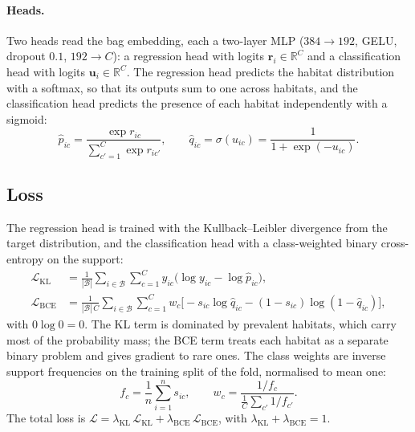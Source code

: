 \paragraph{Heads.}
Two heads read the bag embedding, each a two-layer MLP
($384 \to 192$, GELU, dropout $0.1$, $192 \to C$):
a regression head with logits $\mathbf{r}_i \in \mathbb{R}^{C}$ and a
classification head with logits $\mathbf{u}_i \in \mathbb{R}^{C}$. The regression
head predicts the habitat distribution with a softmax, so that its outputs sum
to one across habitats, and the classification head predicts the presence of
each habitat independently with a sigmoid:
\begin{equation}
  \hat p_{ic} = \frac{\exp r_{ic}}{\sum_{c'=1}^{C} \exp r_{ic'}}, \qquad
  \hat q_{ic} = \sigma(u_{ic}) = \frac{1}{1 + \exp(-u_{ic})}.
\end{equation}

\subsection{Loss}

The regression head is trained with the Kullback--Leibler divergence from the
target distribution, and the classification head with a class-weighted binary
cross-entropy on the support:
\begin{align}
  \mathcal{L}_\text{KL} &= \frac{1}{|\mathcal{B}|} \sum_{i \in \mathcal{B}} \sum_{c=1}^{C} y_{ic} \big( \log y_{ic} - \log \hat p_{ic} \big), \\
  \mathcal{L}_\text{BCE} &= \frac{1}{|\mathcal{B}|\,C} \sum_{i \in \mathcal{B}} \sum_{c=1}^{C} w_c \Big[ -s_{ic} \log \hat q_{ic} - (1 - s_{ic}) \log (1 - \hat q_{ic}) \Big],
\end{align}
with $0 \log 0 = 0$. The KL term is dominated by prevalent habitats, which carry
most of the probability mass; the BCE term treats each habitat as a separate
binary problem and gives gradient to rare ones. The class weights are inverse
support frequencies on the training split of the fold, normalised to mean one:
\begin{equation}
  f_c = \frac{1}{n} \sum_{i=1}^{n} s_{ic}, \qquad
  w_c = \frac{1/f_c}{\frac{1}{C} \sum_{c'} 1/f_{c'}}.
\end{equation}
The total loss is
$\mathcal{L} = \lambda_\text{KL}\, \mathcal{L}_\text{KL} + \lambda_\text{BCE}\, \mathcal{L}_\text{BCE}$,
with $\lambda_\text{KL} + \lambda_\text{BCE} = 1$.

